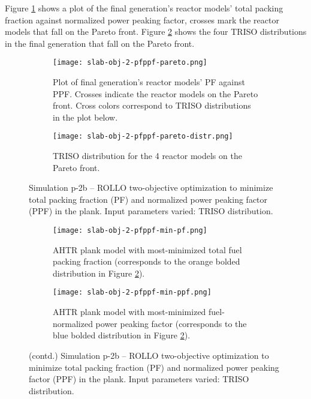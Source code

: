 Figure \ref{fig:slab-obj-2-pfppf-pareto} shows a plot of the final generation's reactor models' 
total packing fraction against normalized power peaking factor, crosses mark the reactor 
models that fall on the Pareto front.
Figure \ref{fig:slab-obj-2-pfppf-pareto-distr} shows the four TRISO distributions in 
the final generation that fall on the Pareto front. 
\begin{figure}[htbp!]
    \centering
    \begin{subfigure}{\textwidth}
        \texttt{[image: slab-obj-2-pfppf-pareto.png]}
        \caption{Plot of final generation's reactor models' PF against PPF. 
        Crosses indicate the reactor models on the Pareto front. Cross colors correspond  
        to TRISO distributions in the plot below.}
        \label{fig:slab-obj-2-pfppf-pareto} 
    \end{subfigure}
    \begin{subfigure}{\textwidth}
        \texttt{[image: slab-obj-2-pfppf-pareto-distr.png]}
        \caption{TRISO distribution for the 4 reactor models on the Pareto front.}
        \label{fig:slab-obj-2-pfppf-pareto-distr} 
    \end{subfigure}
    \caption{Simulation p-2b -- ROLLO two-objective optimization to minimize total packing 
    fraction (PF) and normalized power peaking factor (PPF) in the plank. 
    Input parameters varied: TRISO distribution.}
    \label{fig:slab-obj-2-pfppf}
\end{figure}
\begin{figure}[htbp!]
    \ContinuedFloat
    \begin{subfigure}{\textwidth}
        \texttt{[image: slab-obj-2-pfppf-min-pf.png]}
        \caption{\gls{AHTR} plank model with most-minimized total fuel packing fraction
        (corresponds to the orange bolded distribution in Figure 
        \ref{fig:slab-obj-2-pfppf-pareto-distr}).}
        \label{fig:slab-obj-2-pfppf-min-pf} 
    \end{subfigure}
    \begin{subfigure}{\textwidth}
        \texttt{[image: slab-obj-2-pfppf-min-ppf.png]}
        \caption{\gls{AHTR} plank model with most-minimized fuel-normalized power peaking 
        factor (corresponds to the blue bolded distribution in Figure 
        \ref{fig:slab-obj-2-pfppf-pareto-distr}).}
        \label{fig:slab-obj-2-pfppf-min-ppf} 
    \end{subfigure}
    \caption{(contd.) Simulation p-2b -- ROLLO two-objective optimization to minimize 
    total packing fraction (PF) and normalized power peaking factor (PPF) in the plank. 
    Input parameters varied: TRISO distribution.}
\end{figure}

